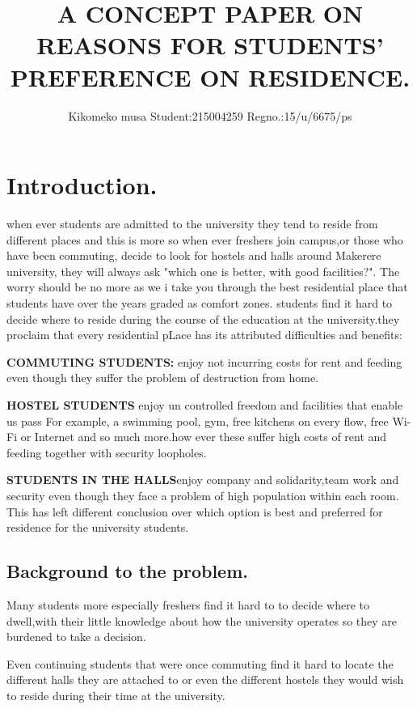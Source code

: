\documentclass[a4paper,12pt]{article}
\begin{document}
\title{A CONCEPT PAPER ON REASONS FOR STUDENTS' PREFERENCE ON RESIDENCE.}
\author{Kikomeko musa 	Student:215004259 Regno.:15/u/6675/ps} 

\maketitle
\section{Introduction.}
when ever students are admitted to the university they tend to reside from different places and this is more so when ever freshers join campus,or those who have been commuting, decide to look for hostels and halls around Makerere university, they will always ask "which one is better, with good facilities?".
The worry should be no more as we i take you through the best residential place that students have over the years graded as comfort zones.
\newline
\newline
students find it hard to decide where to reside during the course of the education at the university.they proclaim that every residential pLace has its attributed difficulties and benefits:


\textbf{COMMUTING STUDENTS:} 
enjoy not incurring costs for rent and feeding even though they suffer the problem of destruction from home.


\textbf{HOSTEL STUDENTS} enjoy un controlled freedom and facilities that enable us pass For example, a swimming pool, gym, free kitchens on every flow, free Wi-Fi or Internet and so much more.how ever these suffer high costs of rent and feeding together with security loopholes.


\textbf{STUDENTS IN THE HALLS}enjoy company and solidarity,team work and security even though they face a problem of high population within each room.
This has left different conclusion over which option is best and preferred for residence for the university students.
\subsection{Background to the problem.}
Many students more especially freshers find it hard to to decide where to dwell,with their little knowledge about how the university operates so they are burdened to take a decision.


Even continuing students that were once commuting find it hard to locate the different halls they are attached to or even the different hostels they would wish to reside during their time at the university. 
\end{document}
